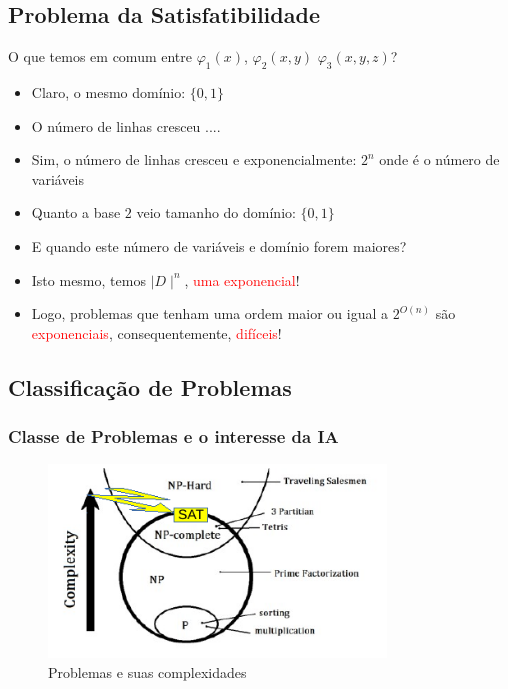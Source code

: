 \documentclass{beamer}
\begin{document}
\subsection{Problema da Satisfatibilidade}

\begin{frame}[fragile]

\begin{block}{O que temos em comum entre $\varphi_1 (x)$, $\varphi_2 (x,y)$
$\varphi_3 (x,y,z)$?}
\pause
\begin{itemize}
  \item Claro, o mesmo domínio: $\{0,1\}$ 
  \item O número de linhas cresceu ....
  \pause
    \item Sim, o número de linhas cresceu e exponencialmente: \textbf{$2^{n}$} onde é o número
    de variáveis 
      \item Quanto a base $2$ veio tamanho do domínio: $\{0,1\}$
      \pause
      \item E quando este número de variáveis e domínio forem maiores?
\pause
      \item Isto mesmo, temos $\mid D\mid ^{n}$, \textcolor{red}{uma exponencial}!
\pause
  \item Logo, problemas que tenham uma ordem maior ou igual a {\Large \textbf{$2^{O(n)}$}}
  são \textcolor{red}{exponenciais}, consequentemente, \textcolor{red}{difíceis}!
  \end{itemize}

\end{block}

\end{frame}



\subsection{Classificação de Problemas}

\begin{frame}
\frametitle{Classe de Problemas e o interesse da IA}

\begin{figure}[ht!]
 \centering
 \includegraphics[width=0.8\textwidth , height=0.6\textheight]{figures/classes_problemas.pdf}
 \caption{Problemas e suas complexidades} 
\end{figure}

\end{frame}
\end{document}
